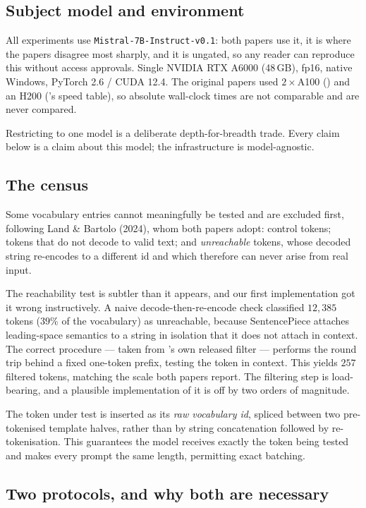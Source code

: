 \subsection{Subject model and environment}

All experiments use \texttt{Mistral-7B-Instruct-v0.1}: both papers use it, it is
where the papers disagree most sharply, and it is ungated, so any reader can
reproduce this without access approvals. Single NVIDIA RTX A6000 (48\,GB), fp16,
native Windows, PyTorch 2.6 / CUDA 12.4. The original papers used $2\times$A100
(\gp{}) and an H200 (\gc{}'s speed table), so absolute wall-clock times are not
comparable and are never compared.

Restricting to one model is a deliberate depth-for-breadth trade. Every claim
below is a claim about this model; the infrastructure is model-agnostic.

\subsection{The census}

Some vocabulary entries cannot meaningfully be tested and are excluded first,
following Land \& Bartolo (2024), whom both papers adopt: control tokens; tokens
that do not decode to valid text; and \emph{unreachable} tokens, whose decoded
string re-encodes to a different id and which therefore can never arise from real
input.

The reachability test is subtler than it appears, and our first implementation
got it wrong instructively. A naive decode-then-re-encode check classified
$12{,}385$ tokens ($39\%$ of the vocabulary) as unreachable, because SentencePiece
attaches leading-space semantics to a string in isolation that it does not attach
in context. The correct procedure --- taken from \gc{}'s own released filter ---
performs the round trip behind a fixed one-token prefix, testing the token in
context. This yields $257$ filtered tokens, matching the scale both papers
report. The filtering step is load-bearing, and a plausible implementation of it
is off by two orders of magnitude.

The token under test is inserted as its \emph{raw vocabulary id}, spliced between
two pre-tokenised template halves, rather than by string concatenation followed
by re-tokenisation. This guarantees the model receives exactly the token being
tested and makes every prompt the same length, permitting exact batching.

\subsection{Two protocols, and why both are necessary}
\label{sec:protocols}

